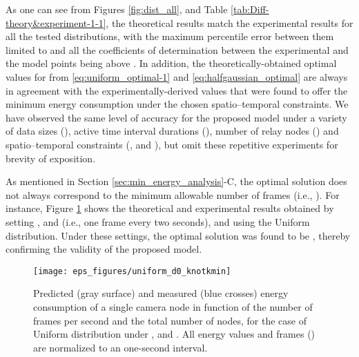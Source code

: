\documentclass[twocolumn,english]{IEEEtran}
\theoremstyle{plain}
\theoremstyle{definition}
\begin{document}
As one can see from Figures \ref{fig:dist_all}, and Table \ref{tab:Diff-theory&experiment-1-1},
the theoretical results match the experimental results for all the
tested distributions, with the maximum percentile error between them
limited to  and all the coefficients of determination 
between the experimental and the model points being above .
In addition, the theoretically-obtained optimal values for 
from \eqref{eq:uniform_optimal-1} and \eqref{eq:halfgaussian_optimal}
are always in agreement with the experimentally-derived values that
were found to offer the minimum energy consumption under the chosen
spatio--temporal constraints. We have observed the same level of accuracy
for the proposed model under a variety of data sizes (), active
time interval durations (), number of relay nodes () and spatio--temporal
constraints (,  and ), but
omit these repetitive experiments for brevity of exposition.

As mentioned in Section \ref{sec:min_energy_analysis}-C, the optimal
solution does not always correspond to the minimum allowable number
of frames (i.e., ). For instance, Figure \ref{fig:dist_kmin}
shows the theoretical and experimental results obtained by setting
,  and  (i.e., one
frame every two seconds), and using the Uniform distribution. Under
these settings, the optimal solution was found to be ,
thereby confirming the validity of the proposed model.

\begin{figure}
\begin{centering}
\texttt{[image: eps\_figures/uniform\_d0\_knotkmin]}
\par\end{centering}

\caption{Predicted (gray surface) and measured (blue crosses) energy consumption
of a single camera node in function of the number of frames per second
and the total number of nodes, for the case of Uniform distribution
under ,  and . All
energy values and frames () are normalized to an one-second interval.
\label{fig:dist_kmin}}
\end{figure}
\end{document}
